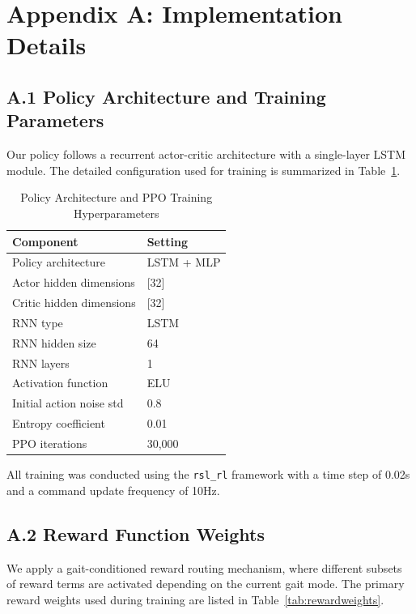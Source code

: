 \documentclass[letterpaper, 10 pt, conference]{ieeeconf}
\begin{document}


\appendix
\section*{Appendix A: Implementation Details}

\subsection*{A.1 Policy Architecture and Training Parameters}

Our policy follows a recurrent actor-critic architecture with a single-layer LSTM module. The detailed configuration used for training is summarized in Table~\ref{tab:hyperparams}.


\begin{table}[h]
\centering
\caption{Policy Architecture and PPO Training Hyperparameters}
\label{tab:hyperparams}
\begin{tabular}{ll}
\toprule
\textbf{Component}               & \textbf{Setting} \\
\midrule
Policy architecture             & LSTM + MLP \\
Actor hidden dimensions         & [32] \\
Critic hidden dimensions        & [32] \\
RNN type                        & LSTM \\
RNN hidden size                 & 64 \\
RNN layers                      & 1 \\
Activation function             & ELU \\
Initial action noise std        & 0.8 \\
Entropy coefficient             & 0.01 \\
PPO iterations                  & 30,000 \\
\bottomrule
\end{tabular}
\end{table}
\vspace{1em}
All training was conducted using the \texttt{rsl\_rl} framework with a time step of 0.02s and a command update frequency of 10Hz.
\subsection*{A.2 Reward Function Weights}

We apply a gait-conditioned reward routing mechanism, where different subsets of reward terms are activated depending on the current gait mode. The primary reward weights used during training are listed in Table~\ref{tab:rewardweights}.
\end{document}
